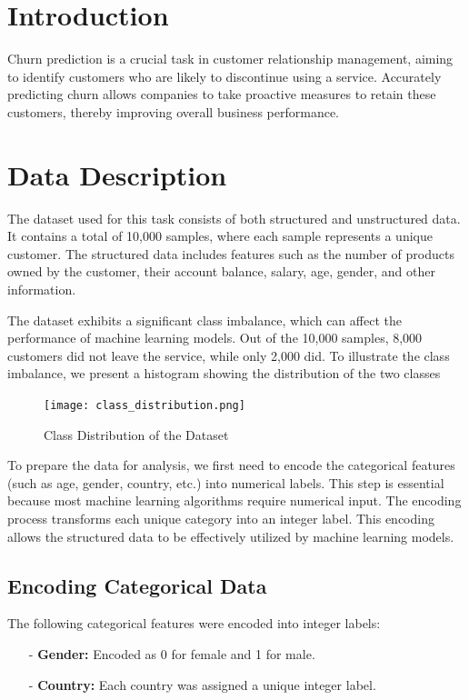 \documentclass[12pt]{article}
\begin{document}
\section{Introduction}
Churn prediction is a crucial task in customer relationship management, aiming to identify customers who are likely to discontinue using a service. Accurately predicting churn allows companies to take proactive measures to retain these customers, thereby improving overall business performance.

\section{Data Description}
The dataset used for this task consists of both structured and unstructured data. It contains a total of 10,000 samples, where each sample represents a unique customer. The structured data includes features such as the number of products owned by the customer, their account balance, salary, age, gender, and other information. 

The dataset exhibits a significant class imbalance, which can affect the performance of machine learning models. Out of the 10,000 samples, 8,000 customers did not leave the service, while only 2,000 did. To illustrate the class imbalance, we present a histogram showing the distribution of the two classes

\begin{figure}[h!]
    \centering
    \texttt{[image: class\_distribution.png]}
    \caption{Class Distribution of the Dataset}
    \label{fig:class_distribution}
\end{figure}

To prepare the data for analysis, we first need to encode the categorical features (such as age, gender, country, etc.) into numerical labels. This step is essential because most machine learning algorithms require numerical input. The encoding process transforms each unique category into an integer label. This encoding allows the structured data to be effectively utilized by machine learning models.

\subsection{Encoding Categorical Data}
The following categorical features were encoded into integer labels:
\begin{itemize}
    \item[-] \textbf{Gender:} Encoded as 0 for female and 1 for male.
    \item[-] \textbf{Country:} Each country was assigned a unique integer label.
\end{itemize}
 
\end{document}

